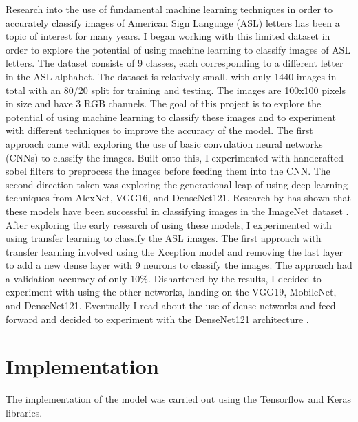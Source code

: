 \documentclass[conference]{IEEEtran}
\begin{document}
Research into the use of fundamental machine learning techniques in order to accurately classify images of American Sign Language (ASL) letters has been a topic of interest for many years. I began working with this limited dataset in order to explore the potential of using machine learning to classify images of ASL letters. The dataset consists of 9 classes, each corresponding to a different letter in the ASL alphabet. The dataset is relatively small, with only 1440 images in total with an 80/20 split for training and testing. The images are 100x100 pixels in size and have 3 RGB channels. The goal of this project is to explore the potential of using machine learning to classify these images and to experiment with different techniques to improve the accuracy of the model. The first approach came with exploring the use of basic convulation neural networks (CNNs) to classify the images. Built onto this, I experimented with handcrafted sobel filters to preprocess the images before feeding them into the CNN. The second direction taken was exploring the generational leap of using deep learning techniques from AlexNet, VGG16, and DenseNet121. Research by has shown that these models have been successful in classifying images in the ImageNet dataset \cite{NIPS2012_c399862d}. After exploring the early research of using these models, I experimented with using transfer learning to classify the ASL images. The first approach with transfer learning involved using the Xception model and removing the last layer to add a new dense layer with 9 neurons to classify the images. The approach had a validation accuracy of only $10\%$. Dishartened by the results, I decided to experiment with using the other networks, landing on the VGG19, MobileNet, and DenseNet121. Eventually I read about the use of dense networks and feed-forward and decided to experiment with the DenseNet121 architecture \cite{DBLP:journals/corr/HuangLW16a}.

\section{Implementation}
The implementation of the model was carried out using the Tensorflow and Keras libraries.
\end{document}
